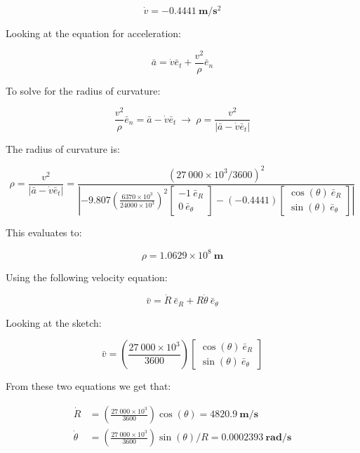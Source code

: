 \documentclass[12pt, letterpaper]{../assignment}
\begin{document}
\begin{answer}
$$ \dot{v} = -0.4441 \ \textbf{m}/\textbf{s}^2  $$
\end{answer}

Looking at the equation for acceleration:

$$ \bar{a} = \dot{v} \bar{e}_t + \frac{v^2}{\rho}\bar{e}_n $$

To solve for the radius of curvature:

$$ \frac{v^2}{\rho}\bar{e}_n = \bar{a} -\dot{v} \bar{e}_t \ \rightarrow
\ \rho = \frac{v^2}{|\bar{a} -\dot{v} \bar{e}_t|} $$

The radius of curvature is:

$$ \rho = \frac{v^2}{|\bar{a} -\dot{v} \bar{e}_t|} =
\frac{\left(27\ 000 \times 10^3/3600\right)^2}{\left|-9.807\left(\frac{6370 \times 10^3}{24000 \times 10^3}\right)^2
\left[\begin{array}{rr} -1\ \bar{e}_R\\ 0 \ \bar{e}_\theta \end{array}\right] -\left(-0.4441\right) 
\left[\begin{array}{c} \cos\left(\theta \right) \ \bar{e}_R \\ \sin\left(\theta \right)\ \bar{e}_\theta \end{array}\right]\right|}
$$

This evaluates to:

\begin{answer}
$$ \rho = 1.0629 \times 10^8 \ \textbf{m}  $$
\end{answer}


Using the following velocity equation:

$$ \bar{v} = \dot{R}\ \bar{e}_R + R \dot{\theta}\ \bar{e}_\theta $$

Looking at the sketch:

$$ \bar{v} = \left(\frac{27\ 000 \times 10^3}{3600}\right)
\left[\begin{array}{c} \cos\left(\theta \right) \ \bar{e}_R \\ \sin\left(\theta \right)\ \bar{e}_\theta \end{array}\right]$$

From these two equations we get that:

\begin{answer}
\begin{equation*}
    \begin{aligned}
        \dot{R} &= \left(\frac{27\ 000 \times 10^3}{3600}\right)\cos\left(\theta \right)
        = 4820.9  \ \textbf{m}/\textbf{s}\\
        \dot{\theta}& = \left(\frac{27\ 000 \times 10^3}{3600}\right)\sin\left(\theta \right)/R
        = 0.0002393  \ \textbf{rad}/\textbf{s}
    \end{aligned}
\end{equation*}
\end{answer}
\end{document}
